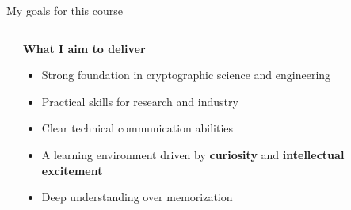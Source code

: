 \documentclass[aspectratio=169, lualatex, handout]{beamer}
\begin{document}
\begin{frame}{My goals for this course}
	\begin{columns}[c]
		\begin{column}{0.5\textwidth}
		\end{column}
		\begin{column}{0.5\textwidth}
			\textbf{What I aim to deliver}
			\begin{itemize}[<+->]
				\item Strong foundation in cryptographic science and engineering
				\item Practical skills for research and industry
				\item Clear technical communication abilities
				\item A learning environment driven by \textbf{curiosity} and \textbf{intellectual excitement}
				\item Deep understanding over memorization
			\end{itemize}
		\end{column}
	\end{columns}
\end{frame}
\end{document}
